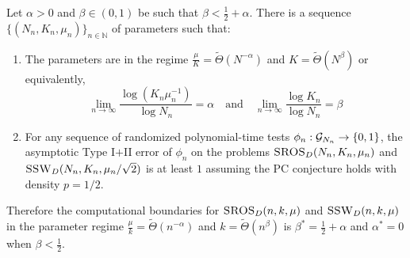 \begin{theorem} \label{thm:ssw}
Let $\alpha > 0$ and $\beta \in (0, 1)$ be such that $\beta < \frac{1}{2} + \alpha$. There is a sequence $\{ (N_n, K_n, \mu_n) \}_{n \in \mathbb{N}}$ of parameters such that:
\begin{enumerate}
\item The parameters are in the regime $\frac{\mu}{K} = \tilde{\Theta}(N^{-\alpha})$ and $K = \tilde{\Theta}(N^\beta)$ or equivalently,
$$\lim_{n \to \infty} \frac{\log (K_n \mu_n^{-1})}{\log N_n} = \alpha \quad \text{and} \quad \lim_{n \to \infty} \frac{\log K_n}{\log N_n} = \beta$$
\item For any sequence of randomized polynomial-time tests $\phi_n : \mathcal{G}_{N_n} \to \{0, 1\}$, the asymptotic Type I$+$II error of $\phi_n$ on the problems $\textsc{SROS}_D(N_n, K_n, \mu_n)$ and $\textsc{SSW}_D(N_n, K_n, \mu_n/\sqrt{2})$ is at least $1$ assuming the PC conjecture holds with density $p = 1/2$.
\end{enumerate}
Therefore the computational boundaries for $\textsc{SROS}_D(n, k, \mu)$ and $\textsc{SSW}_D(n, k, \mu)$ in the parameter regime $\frac{\mu}{k} = \tilde{\Theta}(n^{-\alpha})$ and $k = \tilde{\Theta}(n^\beta)$ is $\beta^* = \frac{1}{2} + \alpha$ and $\alpha^* = 0$ when $\beta < \frac{1}{2}$.
\end{theorem}

